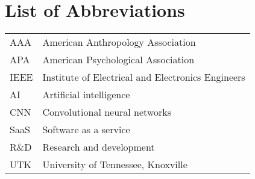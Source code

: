 \chapter*{List of Abbreviations} \label{abbreviations}

\begin{tabular}{L{1.1in} L{4.6in}}
AAA & American Anthropology Association \\
APA & American Psychological Association \\
IEEE & Institute of Electrical and Electronics Engineers \\
AI & Artificial intelligence \\
CNN & Convolutional neural networks \\
SaaS & Software as a service \\
R\&D & Research and development \\
UTK & University of Tennessee, Knoxville \\
\end{tabular}

